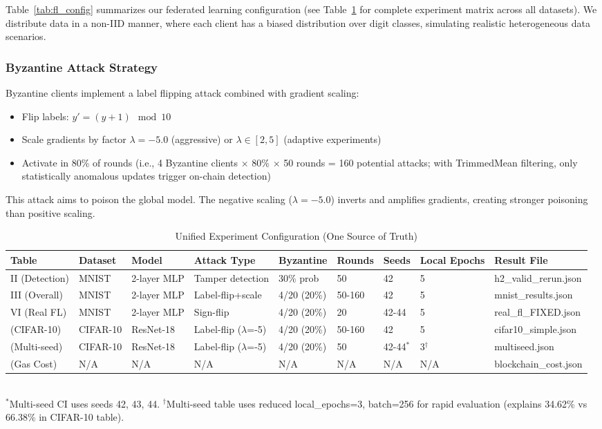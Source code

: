 \documentclass[12pt,a4paper,onecolumn]{article}
\begin{document}
Table~\ref{tab:fl_config} summarizes our federated learning configuration (see Table~\ref{tab:experiment_config} for complete experiment matrix across all datasets). We distribute data in a non-IID manner, where each client has a biased distribution over digit classes, simulating realistic heterogeneous data scenarios.

\subsubsection{Byzantine Attack Strategy}

Byzantine clients implement a label flipping attack combined with gradient scaling:
\begin{itemize}
    \item Flip labels: $y' = (y + 1) \mod 10$
    \item Scale gradients by factor $\lambda = -5.0$ (aggressive) or $\lambda \in [2, 5]$ (adaptive experiments)
    \item Activate in 80\% of rounds (i.e., 4 Byzantine clients $\times$ 80\% $\times$ 50 rounds = 160 potential attacks; with TrimmedMean filtering, only statistically anomalous updates trigger on-chain detection)
\end{itemize}

This attack aims to poison the global model. The negative scaling ($\lambda=-5.0$) inverts and amplifies gradients, creating stronger poisoning than positive scaling.

\begin{table}[t]
\caption{Unified Experiment Configuration (One Source of Truth)}
\label{tab:experiment_config}
\centering
\small
\begin{tabular}{p{1.8cm}p{1.5cm}p{1.2cm}p{2.3cm}p{1.5cm}p{1cm}p{1cm}p{1.5cm}p{2cm}}
\toprule
\textbf{Table} & \textbf{Dataset} & \textbf{Model} & \textbf{Attack Type} & \textbf{Byzantine} & \textbf{Rounds} & \textbf{Seeds} & \textbf{Local Epochs} & \textbf{Result File} \\
\midrule
II (Detection) & MNIST & 2-layer MLP & Tamper detection & 30\% prob & 50 & 42 & 5 & h2\_valid\_rerun.json \\
III (Overall) & MNIST & 2-layer MLP & Label-flip+scale & 4/20 (20\%) & 50-160 & 42 & 5 & mnist\_results.json \\
VI (Real FL) & MNIST & 2-layer MLP & Sign-flip & 4/20 (20\%) & 20 & 42-44 & 5 & real\_fl\_FIXED.json \\
(CIFAR-10) & CIFAR-10 & ResNet-18 & Label-flip ($\lambda$=-5) & 4/20 (20\%) & 50-160 & 42 & 5 & cifar10\_simple.json \\
(Multi-seed) & CIFAR-10 & ResNet-18 & Label-flip ($\lambda$=-5) & 4/20 (20\%) & 50 & 42-44$^*$ & 3$^\dagger$ & multiseed.json \\
(Gas Cost) & N/A & N/A & N/A & N/A & N/A & N/A & N/A & blockchain\_cost.json \\
\bottomrule
\end{tabular}
\\[0.1cm]
\small $^*$Multi-seed CI uses seeds 42, 43, 44. $^\dagger$Multi-seed table uses reduced local\_epochs=3, batch=256 for rapid evaluation (explains 34.62\% vs 66.38\% in CIFAR-10 table).
\end{table}
\end{document}
